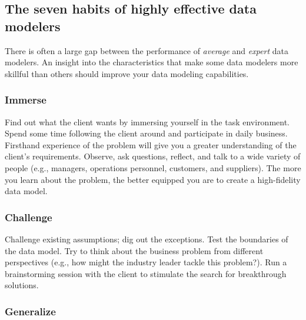 \documentclass[
]{article}
\begin{document}
\hypertarget{the-seven-habits-of-highly-effective-data-modelers}{%
\subsection*{The seven habits of highly effective data modelers}\label{the-seven-habits-of-highly-effective-data-modelers}}

There is often a large gap between the performance of \emph{average} and
\emph{expert} data modelers. An insight into the characteristics that make
some data modelers more skillful than others should improve your data
modeling capabilities.

\hypertarget{immerse}{%
\subsubsection*{Immerse}\label{immerse}}

Find out what the client wants by immersing yourself in the task
environment. Spend some time following the client around and participate
in daily business. Firsthand experience of the problem will give you a
greater understanding of the client's requirements. Observe, ask
questions, reflect, and talk to a wide variety of people (e.g.,
managers, operations personnel, customers, and suppliers). The more you
learn about the problem, the better equipped you are to create a
high-fidelity data model.

\hypertarget{challenge}{%
\subsubsection*{Challenge}\label{challenge}}

Challenge existing assumptions; dig out the exceptions. Test the
boundaries of the data model. Try to think about the business problem
from different perspectives (e.g., how might the industry leader tackle
this problem?). Run a brainstorming session with the client to stimulate
the search for breakthrough solutions.

\hypertarget{generalize}{%
\subsubsection*{Generalize}\label{generalize}}
\end{document}
